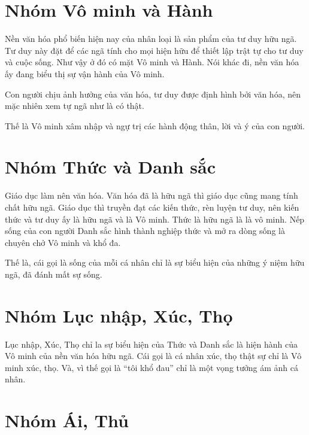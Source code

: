 \section{Nhóm Vô minh và Hành} %
\label{sec:vo_minh_va_hanh}

Nền văn hóa phổ biến hiện nay của nhân loại là sản phẩm của tư duy hữu ngã. Tư duy này đặt để các ngã tính cho mọi hiện hữu để thiết lập trật tự cho tư duy và cuộc sống. Như vậy ở đó có mặt Vô minh và Hành. Nói khác đi, nền văn hóa ấy đang biểu thị sự vận hành của Vô minh.

Con người chịu ảnh hưởng của văn hóa, tư duy được định hình bởi văn hóa, nên mặc nhiên xem tự ngã như là có thật.

Thế là Vô minh xâm nhập và ngự trị các hành động thân, lời và ý của con người.


\section{Nhóm Thức và Danh sắc} %
\label{sec:thuc_va_danh_sac}

Giáo dục làm nên văn hóa. Văn hóa đã là hữu ngã thì giáo dục cũng mang tính chất hữu ngã. Giáo dục thì truyền đạt các kiến thức, rèn luyện tư duy, nên kiến thức và tư duy ấy là hữu ngã và là Vô minh. Thức là hữu ngã là là vô minh. Nếp sống của con người Danh sắc hình thành nghiệp thức và mở ra dòng sống là chuyên chở Vô minh và khổ đa.

Thế là, cái gọi là sống của mỗi cá nhân chỉ là sự biểu hiện của những ý niệm hữu ngã, đã đánh mất sự sống.


\section{Nhóm Lục nhập, Xúc, Thọ} %
\label{sec:luc_nhap_xuc_tho}

Lục nhập, Xúc, Thọ chỉ la sự biểu hiện của Thức và Danh sắc là hiện hành của Vô minh của nền văn hóa hữu ngã. Cái gọi là cá nhân xúc, thọ thật sự chỉ là Vô minh xúc, thọ. Và, vì thế gọi là ``tôi khổ đau'' chỉ là một vọng tưởng ám ảnh cá nhân.


\section{Nhóm Ái, Thủ} %
\label{sec:ai_thu}


